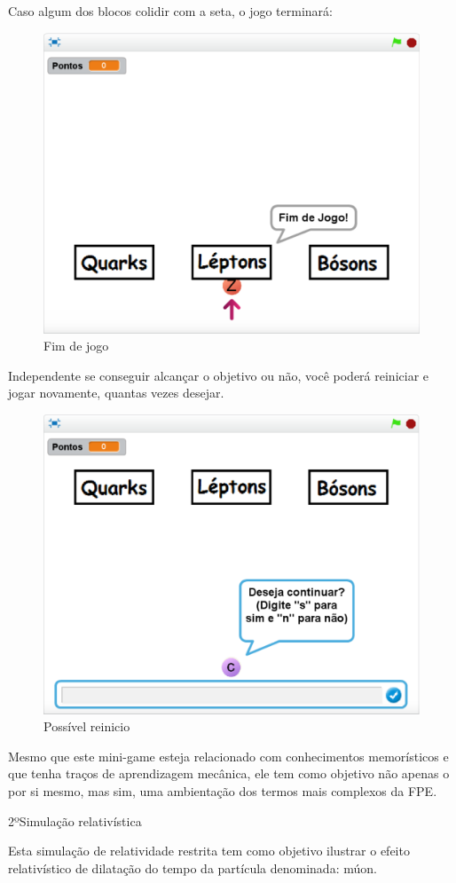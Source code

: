 \documentclass[12pt,fleqn]{book} %
\begin{document}
\newpage

Caso algum dos blocos colidir com a seta, o jogo terminará:

\begin{figure}[h]
	\centering
	\includegraphics[width=0.65 \textwidth]{Produto/class7}
	\caption{Fim de jogo}
	\label{fig:app_a:class7}
\end{figure}

Independente se conseguir alcançar o objetivo ou não, você poderá reiniciar e jogar novamente, quantas vezes desejar.

\begin{figure}[h]
	\centering
	\includegraphics[width=0.65 \textwidth]{Produto/class9}
	\caption{Possível reinicio}
	\label{fig:app_a:class9}
\end{figure}

\newpage

Mesmo que este mini-game esteja relacionado com conhecimentos memorísticos e que tenha traços de aprendizagem mecânica, ele tem como objetivo não apenas o  por si mesmo, mas sim, uma ambientação dos termos mais complexos da FPE.

2ºSimulação relativística

Esta simulação de relatividade restrita tem como objetivo ilustrar o efeito relativístico de dilatação do tempo da partícula denominada: múon.
\end{document}
